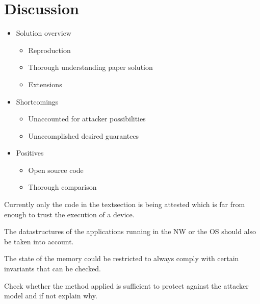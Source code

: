 \documentclass{report}
\begin{document}
\chapter{Discussion}

\begin{itemize}
\item Solution overview \begin{itemize}
\item Reproduction
\item Thorough understanding paper solution
\item Extensions
\end{itemize}
\item Shortcomings \begin{itemize}
\item Unaccounted for attacker possibilities
\item Unaccomplished desired guarantees
\end{itemize}
\item Positives \begin{itemize}
\item Open source code
\item Thorough comparison
\end{itemize}
\end{itemize}

Currently only the code in the textsection is being attested which is far from enough to trust the execution of a device.
\medskip

The datastructures of the applications running in the NW or the OS should also be taken into account.
\medskip

The state of the memory could be restricted to always comply with certain invariants that can be checked.
\medskip

Check whether the method applied is sufficient to protect against the attacker model and if not explain why.
\end{document}
